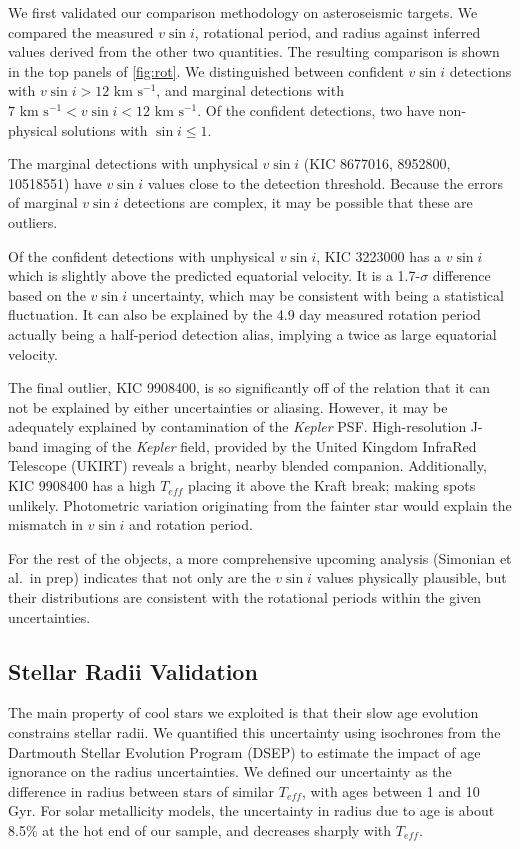 \documentclass[manuscript]{aastex6}
\newcommand{\vsini}{\ensuremath{v \sin i}}
\newcommand{\Kepler}{\mbox{\textit{Kepler}}}
\newcommand{\Teff}{\ensuremath{T_{eff}}}
\newcommand{\kms}{\textrm{ km~s}\ensuremath{^{-1}}}
\begin{document}
We first validated our comparison methodology on asteroseismic targets. We 
compared the measured \vsini{}, rotational period, and radius against 
inferred values derived from the other two quantities. The resulting 
comparison is shown in the top panels of \cref{fig:rot}. We distinguished 
between confident \vsini{} detections with \(\vsini > 12 \kms\), and marginal 
detections with \(7 \kms < \vsini < 12 \kms\). Of the confident detections, 
two  have non-physical solutions with \(\sin i \le 1\). 

The marginal detections with unphysical \vsini{} (KIC 8677016, 8952800, 10518551) 
have \vsini{} values close to the detection threshold. Because the errors of 
marginal \vsini{} detections are complex, 
it may be possible that these are outliers. 

Of the confident detections with unphysical \vsini{}, KIC 3223000 has a
\vsini{} which is slightly above the predicted equatorial velocity. It
is a 1.7-\(\sigma\) difference based on the \vsini{} uncertainty, which
may be consistent with being a statistical fluctuation. It can also
be explained by the 4.9 day measured rotation period actually being a 
half-period detection alias, implying a twice as large equatorial velocity. 

The final outlier, KIC 9908400, is so significantly off of the relation
that it can not be explained by either uncertainties or aliasing. However,
it may be adequately explained by contamination of the \Kepler{} PSF\@. 
High-resolution J-band imaging of the \Kepler{} field, provided by the United
Kingdom InfraRed Telescope (UKIRT) reveals a bright, nearby blended companion.
Additionally, KIC 9908400 has a high \Teff{} placing it above the Kraft break;
making spots unlikely. Photometric variation originating from the fainter 
star would explain the mismatch in \vsini{} and rotation period.

For the rest of the objects, a more comprehensive upcoming analysis 
(Simonian et al.\ in prep) indicates that not only are the \vsini{} values 
physically plausible, but their distributions are consistent with the
rotational periods within the given uncertainties.

\subsection{Stellar Radii Validation}
\label{sec:radii}

The main property of cool stars we exploited is that their slow age evolution
constrains stellar radii. We quantified this uncertainty using isochrones from 
the Dartmouth Stellar Evolution Program (DSEP) to estimate the impact of age 
ignorance on the radius uncertainties. We defined our uncertainty as the 
difference in radius between stars of similar \Teff{}, with ages between 1 
and 10 Gyr. For solar metallicity models, the uncertainty in radius due to 
age is about 8.5\% at the hot end of our sample, and decreases sharply with 
\Teff. 
\end{document}

